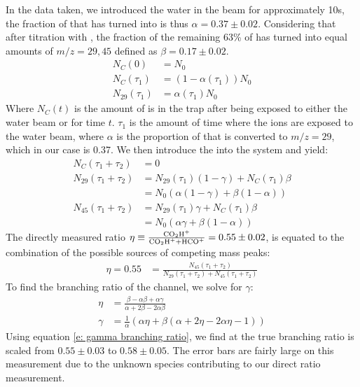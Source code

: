 In the data taken, we introduced the water in the beam for approximately 10s, the fraction of  that has turned into \ce{[HCO]+} is thus $\alpha = 0.37 \pm 0.02$. Considering that after titration with , the fraction of the remaining 63\% of  has turned into equal amounts of $m/z=29, 45$ defined as $\beta = 0.17 \pm 0.02$.
\begin{align*}
	N_C(0) & = N_0 \\
	N_C(\tau_1) & = (1-\alpha(\tau_1))N_0 \\
	N_{29}(\tau_1) & = \alpha(\tau_1) N_0
\end{align*}
Where $N_C(t)$ is the amount of  is in the trap after being exposed to either the water beam or  for time $t$. $\tau_1$ is the amount of time where the ions are exposed to the water beam, where $\alpha$ is the proportion of  that is converted to $m/z=29$, which in our case is 0.37. We then introduce the  into the system and yield:
\begin{align*}
	N_C(\tau_1 + \tau_2) & = 0 \\
	N_{29}(\tau_1 + \tau_2) & = N_{29}(\tau_1)(1-\gamma) + N_C(\tau_1)\beta \\
	& = N_0(\alpha(1-\gamma)+\beta(1-\alpha)) \\
	N_{45}(\tau_1 + \tau_2) & = N_{29}(\tau_1)\gamma + N_C(\tau_1)\beta \\
	& = N_0(\alpha \gamma+\beta(1-\alpha))
\end{align*}
The directly measured ratio $\eta \equiv \frac{\ce{CO2H+}}{\ce{CO2H+} + \ce{HCO+}} = 0.55 \pm 0.02$, is equated to the combination of the possible sources of competing mass peaks:
\begin{align}
	\eta = 0.55 & = \frac{N_{45}(\tau_1 + \tau_2)}{N_{29}(\tau_1 + \tau_2) + N_{45}(\tau_1 + \tau_2)}
\end{align}
To find the branching ratio of the  channel, we solve for $\gamma$:
\begin{align}
	\eta & = \frac{\beta - \alpha \beta + \alpha \gamma}{\alpha + 2\beta - 2\alpha\beta} \nonumber \\
	\gamma & = \frac{1}{\alpha} (\alpha \eta + \beta(\alpha + 2\eta - 2\alpha \eta - 1)) \label{e: gamma branching ratio}
\end{align}
Using equation \ref{e: gamma branching ratio}, we find at the true branching ratio is scaled from $0.55 \pm 0.03$ to $0.58 \pm 0.05$. The error bars are fairly large on this measurement due to the unknown species contributing to our direct ratio measurement.


